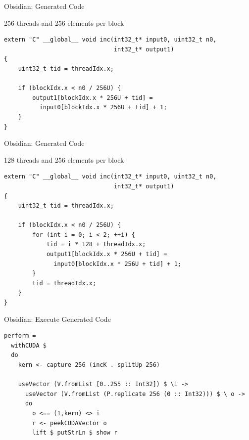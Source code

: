 \documentclass[xcolor=dvipsnames]{beamer}
\begin{document}
%
\newcommand\Fontvi{\fontsize{8}{7.2}\selectfont}

\begin{frame}[fragile]{Obsidian: Generated Code}
\begin{block}{256 threads and 256 elements per block} 
\Fontvi
\begin{verbatim} 
extern "C" __global__ void inc(int32_t* input0, uint32_t n0,
                               int32_t* output1)
{
    uint32_t tid = threadIdx.x;
     
    if (blockIdx.x < n0 / 256U) {
        output1[blockIdx.x * 256U + tid] = 
          input0[blockIdx.x * 256U + tid] + 1;
    }
}
\end{verbatim} 

\end{block}
\end{frame}

%
\begin{frame}[fragile]{Obsidian: Generated Code}
\begin{block}{128 threads and 256 elements per block}
\Fontvi
\begin{verbatim} 
extern "C" __global__ void inc(int32_t* input0, uint32_t n0,
                               int32_t* output1)
{
    uint32_t tid = threadIdx.x;
    
    if (blockIdx.x < n0 / 256U) {
        for (int i = 0; i < 2; ++i) {
            tid = i * 128 + threadIdx.x;
            output1[blockIdx.x * 256U + tid] = 
              input0[blockIdx.x * 256U + tid] + 1;
        }
        tid = threadIdx.x;
    }
}
\end{verbatim} 
\end{block} 


\end{frame} 

\begin{frame}[fragile]{Obsidian: Execute Generated Code}
  
  \begin{block}{}
    \Fontvi
\begin{verbatim}
perform =
  withCUDA $
  do
    kern <- capture 256 (incK . splitUp 256) 

    useVector (V.fromList [0..255 :: Int32]) $ \i ->
      useVector (V.fromList (P.replicate 256 (0 :: Int32))) $ \ o ->
      do
        o <== (1,kern) <> i 
        r <- peekCUDAVector o
        lift $ putStrLn $ show r     
\end{verbatim} 
  \end{block}
\end{frame} 
\end{document}
